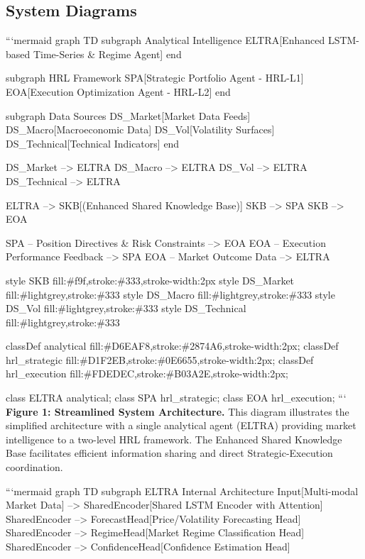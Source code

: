 \documentclass[11pt,a4paper]{article}
\begin{document}
\subsection{System Diagrams}

```mermaid
graph TD
    subgraph Analytical Intelligence
        ELTRA[Enhanced LSTM-based Time-Series \& Regime Agent]
    end

    subgraph HRL Framework
        SPA[Strategic Portfolio Agent - HRL-L1]
        EOA[Execution Optimization Agent - HRL-L2]
    end

    subgraph Data Sources
        DS\_Market[Market Data Feeds]
        DS\_Macro[Macroeconomic Data]
        DS\_Vol[Volatility Surfaces]
        DS\_Technical[Technical Indicators]
    end

    DS\_Market --> ELTRA
    DS\_Macro --> ELTRA
    DS\_Vol --> ELTRA
    DS\_Technical --> ELTRA

    ELTRA --> SKB[(Enhanced Shared Knowledge Base)]
    SKB --> SPA
    SKB --> EOA
    
    SPA -- Position Directives \& Risk Constraints --> EOA
    EOA -- Execution Performance Feedback --> SPA
    EOA -- Market Outcome Data --> ELTRA

    style SKB fill:\#f9f,stroke:\#333,stroke-width:2px
    style DS\_Market fill:\#lightgrey,stroke:\#333
    style DS\_Macro fill:\#lightgrey,stroke:\#333
    style DS\_Vol fill:\#lightgrey,stroke:\#333
    style DS\_Technical fill:\#lightgrey,stroke:\#333

    classDef analytical fill:\#D6EAF8,stroke:\#2874A6,stroke-width:2px;
    classDef hrl\_strategic fill:\#D1F2EB,stroke:\#0E6655,stroke-width:2px;
    classDef hrl\_execution fill:\#FDEDEC,stroke:\#B03A2E,stroke-width:2px;

    class ELTRA analytical;
    class SPA hrl\_strategic;
    class EOA hrl\_execution;
```
\textbf{Figure 1: Streamlined System Architecture.} This diagram illustrates the simplified architecture with a single analytical agent (ELTRA) providing market intelligence to a two-level HRL framework. The Enhanced Shared Knowledge Base facilitates efficient information sharing and direct Strategic-Execution coordination.

```mermaid
graph TD
    subgraph ELTRA Internal Architecture
        Input[Multi-modal Market Data] --> SharedEncoder[Shared LSTM Encoder with Attention]
        SharedEncoder --> ForecastHead[Price/Volatility Forecasting Head]
        SharedEncoder --> RegimeHead[Market Regime Classification Head]
        SharedEncoder --> ConfidenceHead[Confidence Estimation Head]
        
\end{document}
